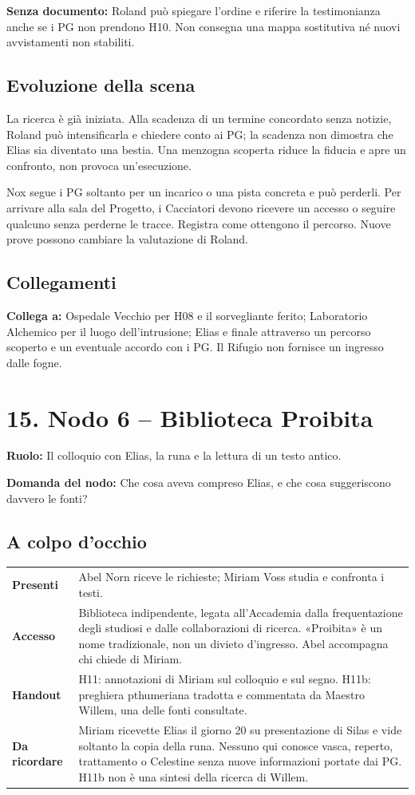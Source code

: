 \documentclass[11pt,a4paper]{article}
\newcommand{\yhdivider}{%
  \par\nobreak\noindent
  \begin{tikzpicture}
    \fill[brass!85] (0,0) -- (0,.7mm) -- (\linewidth,.18mm) -- cycle;
  \end{tikzpicture}\par\nobreak}
\newcommand{\nodehead}[3]{%
\clearpage
{\titleformat{\section}{\displayfont\huge\scshape\color{blood}}{}{0pt}{}[\yhdivider]%
\section{#1}}
\begin{bloodbox}[title={Il nodo al tavolo}]
\textbf{Ruolo:} #2\par\smallskip
\textbf{Domanda del nodo:} #3
\end{bloodbox}}
\newcommand{\linkto}[1]{\begin{routebox}\textbf{Collega a:} #1\end{routebox}}
\begin{document}
\textbf{Senza documento:} Roland può spiegare l'ordine e riferire la testimonianza anche se i PG non prendono H10. Non consegna una mappa sostitutiva né nuovi avvistamenti non stabiliti.

\subsection{Evoluzione della scena}
\begin{clockbox}
La ricerca è già iniziata. Alla scadenza di un termine concordato senza notizie, Roland può intensificarla e chiedere conto ai PG; la scadenza non dimostra che Elias sia diventato una bestia. Una menzogna scoperta riduce la fiducia e apre un confronto, non provoca un'esecuzione.

Nox segue i PG soltanto per un incarico o una pista concreta e può perderli. Per arrivare alla sala del Progetto, i Cacciatori devono ricevere un accesso o seguire qualcuno senza perderne le tracce. Registra come ottengono il percorso. Nuove prove possono cambiare la valutazione di Roland.
\end{clockbox}

\subsection{Collegamenti}
\linkto{Ospedale Vecchio per H08 e il sorvegliante ferito; Laboratorio Alchemico per il luogo dell'intrusione; Elias e finale attraverso un percorso scoperto e un eventuale accordo con i PG. Il Rifugio non fornisce un ingresso dalle fogne.}

\nodehead{15. Nodo 6 -- Biblioteca Proibita}{Il colloquio con Elias, la runa e la lettura di un testo antico.}{Che cosa aveva compreso Elias, e che cosa suggeriscono davvero le fonti?}

\subsection{A colpo d'occhio}
\begin{overviewbox}
\begin{tabularx}{\linewidth}{>{\bfseries}p{32mm} X}
Presenti & Abel Norn riceve le richieste; Miriam Voss studia e confronta i testi.\\
Accesso & Biblioteca indipendente, legata all'Accademia dalla frequentazione degli studiosi e dalle collaborazioni di ricerca. «Proibita» è un nome tradizionale, non un divieto d'ingresso. Abel accompagna chi chiede di Miriam.\\
Handout & H11: annotazioni di Miriam sul colloquio e sul segno. H11b: preghiera pthumeriana tradotta e commentata da Maestro Willem, una delle fonti consultate.\\
Da ricordare & Miriam ricevette Elias il giorno 20 su presentazione di Silas e vide soltanto la copia della runa. Nessuno qui conosce vasca, reperto, trattamento o Celestine senza nuove informazioni portate dai PG. H11b non è una sintesi della ricerca di Willem.\\
\end{tabularx}
\end{overviewbox}
\end{document}
